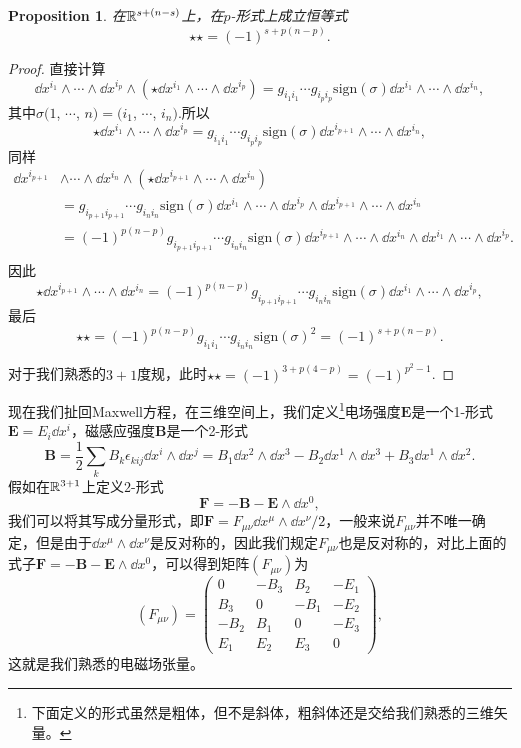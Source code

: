 \documentclass[10pt]{book}
\newtheorem{pro}{Proposition}%
\begin{document}
\begin{pro}
在$\mathbb{R}^{s+(n-s)}$上，在$p$-形式上成立恒等式
	\[\star\star=(-1)^{s+p(n-p)}.\]
\end{pro}
\begin{proof}
	直接计算
	\[
		\dd x^{i_1}\wedge \cdots \wedge \dd x^{i_p}\wedge (\star \dd x^{i_1}\wedge \cdots \wedge \dd x^{i_p})=g_{i_1i_1}\cdots g_{i_pi_p}\mathrm{sign}(\sigma)\dd x^{i_1}\wedge \cdots \wedge \dd x^{i_n},
	\]
其中$\sigma(1$, $\cdots$, $n)=(i_1$, $\cdots$, $i_n)$.所以
		\[
		\star \dd x^{i_1}\wedge \cdots \wedge \dd x^{i_p}=g_{i_1i_1}\cdots g_{i_pi_p}\mathrm{sign}(\sigma)\dd x^{i_{p+1}}\wedge \cdots \wedge \dd x^{i_n},
	\]
同样
	\[
	\begin{split}
			\dd x^{i_{p+1}}&\wedge \cdots \wedge \dd x^{i_n}\wedge (\star \dd x^{i_{p+1}}\wedge \cdots \wedge \dd x^{i_n})\\
			&=g_{i_{p+1}i_{p+1}}\cdots g_{i_ni_n}\mathrm{sign}(\sigma)\dd x^{i_1}\wedge \cdots \wedge \dd x^{i_p}\wedge \dd x^{i_{p+1}}\wedge \cdots \wedge \dd x^{i_n}\\
			&=(-1)^{p(n-p)}g_{i_{p+1}i_{p+1}}\cdots g_{i_ni_n}\mathrm{sign}(\sigma)\dd x^{i_{p+1}}\wedge \cdots \wedge \dd x^{i_n}\wedge \dd x^{i_1}\wedge \cdots \wedge \dd x^{i_p}.\\
	\end{split}
	\]
因此
\[
	\star \dd x^{i_{p+1}}\wedge \cdots \wedge \dd x^{i_n}=(-1)^{p(n-p)}g_{i_{p+1}i_{p+1}}\cdots g_{i_ni_n}\mathrm{sign}(\sigma) \dd x^{i_1}\wedge \cdots \wedge \dd x^{i_p},
\]
最后
\[
	\star\star=(-1)^{p(n-p)}g_{i_{1}i_{1}}\cdots g_{i_ni_n}\mathrm{sign}(\sigma)^2=(-1)^{s+p(n-p)}.
\]

对于我们熟悉的$3+1$度规，此时$\star\star=(-1)^{3+p(4-p)}=(-1)^{p^2-1}$.
\end{proof}

现在我们扯回Maxwell方程，在三维空间上，我们定义\footnote{下面定义的形式虽然是粗体，但不是斜体，粗斜体还是交给我们熟悉的三维矢量。}电场强度$\mathbf{E}$是一个1-形式$\mathbf{E}=E_i\dd x^i$，磁感应强度$\mathbf{B}$是一个2-形式
\[
	\mathbf{B}=\frac{1}{2}\sum_{k}B_k\epsilon_{kij}\dd x^i\wedge \dd x^j=B_1\dd x^2\wedge \dd x^3-B_2\dd x^1\wedge \dd x^3+B_3\dd x^1\wedge \dd x^2.
\]
假如在$\mathbb{R}^{3+1}$上定义$2$-形式
\[
	\mathbf{F}=-\mathbf{B}-\mathbf{E}\wedge \dd x^0,
\]
我们可以将其写成分量形式，即$\mathbf{F}=F_{\mu\nu}\dd x^\mu\wedge \dd x^\nu/2$，一般来说$F_{\mu\nu}$并不唯一确定，但是由于$\dd x^\mu\wedge \dd x^\nu$是反对称的，因此我们规定$F_{\mu\nu}$也是反对称的，对比上面的式子$\mathbf{F}=-\mathbf{B}-\mathbf{E}\wedge \dd x^0$，可以得到矩阵$(F_{\mu\nu})$为
\[
	(F_{\mu\nu})=
	\begin{pmatrix}
	0&-B_3&B_2&-E_1\\
	B_3&0&-B_1&-E_2\\
	-B_2&B_1&0&-E_3\\
	E_1&E_2&E_3&0
	\end{pmatrix},
\]
这就是我们熟悉的电磁场张量。
\end{document}
